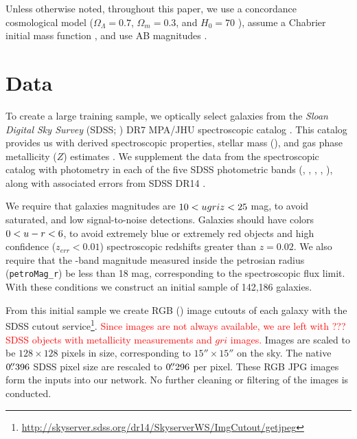 \documentclass[fleqn,usenatbib]{mnras}
\newcommand{\editorial}[1]{\textcolor{red}{#1}}
\begin{document}
Unless otherwise noted, throughout this paper, we use a concordance cosmological model ($\Omega_\Lambda = 0.7$, $\Omega_m = 0.3$, and $H_0= 70$ \kms \permpc), assume a Chabrier initial mass function \citep{Chabrier2003}, and use AB magnitudes \citep{Oke1974}. 


\section{Data} \label{sec:data}
To create a large training sample, we optically select galaxies from the \textit{Sloan Digital Sky Survey} (SDSS; \citealt{York2000}) DR7 MPA/JHU spectroscopic catalog \citep{Kauffmann2003a, Brinchmann2004, Salim2007}. This catalog provides us with derived spectroscopic properties, stellar mass (\mstar), and gas phase metallicity ($Z$) estimates \citep{Tremonti2004}. We supplement the data from the spectroscopic catalog with photometry in each of the five SDSS photometric bands (\sdssu, \sdssg, \sdssr, \sdssi, \sdssz), along with associated errors from SDSS DR14 \citep{Abolfathi2017}.

We require that galaxies magnitudes are $10 < \hbox{$u$} \hbox{$g$} \hbox{$r$} \hbox{$i$} \hbox{$z$} < 25$ mag, to avoid saturated, and low signal-to-noise detections. Galaxies should have colors $0 < \hbox{$u$}-\hbox{$r$} < 6$, to avoid extremely blue or extremely red objects and high confidence ($z_{err} < 0.01$) spectroscopic redshifts greater than $z=0.02$. We also require that the \sdssr-band magnitude measured inside the petrosian radius (\texttt{petroMag\_r}) be less than 18 mag, corresponding to the spectroscopic flux limit.
With these conditions we construct an initial sample of 142,186 galaxies.

From this initial sample we create RGB (\sdssi\sdssr\sdssg) image cutouts of each galaxy with the SDSS cutout service\footnote{\url{http://skyserver.sdss.org/dr14/SkyserverWS/ImgCutout/getjpeg}}. \editorial{Since images are not always available, we are left with ??? SDSS objects with metallicity measurements and $gri$ images.} Images are scaled to be $128\times128$ pixels in size, corresponding to $15''\times15''$ on the sky. The native $0\hbox{$.\!\!^{\prime\prime}$}396$ SDSS pixel size are rescaled to $0\hbox{$.\!\!^{\prime\prime}$}296$ per pixel.
These RGB JPG images form the inputs into our network. No further cleaning or filtering of the images is conducted.
\end{document}
